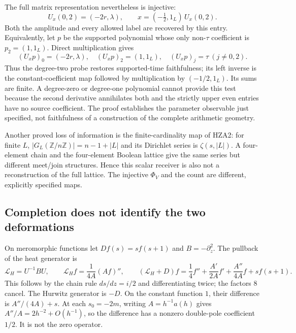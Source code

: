 The full matrix representation nevertheless is injective:
\begin{equation}\tag{CFD16}
 U_x(0,2)=(-2r,\lambda),\qquad
 x=(-\tfrac12,1_L)\,U_x(0,2).
\end{equation}
Both the amplitude and every allowed label are recovered by this
entry. Equivalently, let $p$ be the supported polynomial whose
only non-$\tau$ coefficient is $p_2=(1,1_L)$. Direct multiplication
gives
\begin{equation}\tag{CFD17}
 (U_xp)_0=(-2r,\lambda),\quad (U_xp)_2=(1,1_L),\quad
 (U_xp)_j=\tau\ (j\ne0,2).
\end{equation}
Thus the degree-two probe restores supported-time faithfulness;
its left inverse is the constant-coefficient map followed by
multiplication by $(-1/2,1_L)$. Its sums are finite. A degree-zero
or degree-one polynomial cannot provide this test because the
second derivative annihilates both and the strictly upper even
entries have no source coefficient. The proof establishes the
parameter observable just specified, not faithfulness of a
construction of the complete arithmetic geometry.

Another proved loss of information is the finite-cardinality map
of HZA2: for finite $L$, $|G_L(\mathbb Z/n\mathbb Z)|=n-1+|L|$
and its Dirichlet series is $\zeta(s,|L|)$. A four-element chain
and the four-element Boolean lattice give the same series but
different meet/join structures. Hence this scalar receiver is
also not a reconstruction of the full lattice. The injective
$\Phi_V$ and the count are different, explicitly specified maps.

\subsection{Completion does not identify the two deformations}

On meromorphic functions let $Df(s)=s f(s+1)$ and
$B=-\partial_z^2$. The pullback of the heat generator is
\begin{equation}\tag{CFD18}
 \mathcal L_H=U^{-1}BU,\qquad
 \mathcal L_H f=\frac1{4A}(Af)'',\qquad
 (\mathcal L_H+D)f=
 \frac14 f''+\frac{A'}{2A}f'
             +\frac{A''}{4A}f+s f(s+1).
\end{equation}
This follows by the chain rule $ds/dz=i/2$ and differentiating
twice; the factors $8$ cancel. The Hurwitz generator is $-D$.
On the constant function $1$, their difference is
$A''/(4A)+s$. At each $s_0=-2m$, writing $A=h^{-1}a(h)$ gives
$A''/A=2h^{-2}+O(h^{-1})$, so the difference has a nonzero
double-pole coefficient $1/2$. It is not the zero operator.

